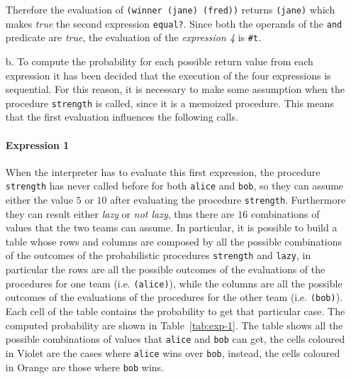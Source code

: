 \begin{itemize}
        Therefore the evaluation of \texttt{(winner \textquotesingle(jane) \textquotesingle(fred))} returns \texttt{\textquotesingle(jane)} 
        which makes \textit{true} the second expression \texttt{equal?}. 
        Since both the operands of the \texttt{and} predicate are \textit{true}, the evaluation of the \textit{expression 4} is 
        \texttt{\#t}.

    \item[b.] To compute the probability for each possible return value from each expression it has been decided that the execution
        of the four expressions is sequential. For this reason, it is necessary to make some assumption when the procedure \texttt{strength} is
        called, since it is a memoized procedure. This means that the first evaluation influences the following calls.

        \paragraph*{Expression 1} When the interpreter has to evaluate this first expression, the procedure \texttt{strength} has never 
        called before for both \texttt{\textquotesingle alice} and \texttt{\textquotesingle bob}, so they can assume either the value $5$ or $10$ after evaluating
        the procedure \texttt{strength}. Furthermore they can result either \textit{lazy} or \textit{not lazy}, thus there are
        $16$ combinations of values that the two teams can assume.
        In particular, it is possible to build a table whose rows and columns are composed by all the possible combinations of
        the outcomes of the probabilistic procedures \texttt{strength} and \texttt{lazy}, in particular
        the rows are all the possible outcomes of the evaluations of the procedures for one team (i.e. \texttt{\textquotesingle (alice)}), 
        while the columns are all the possible outcomes of the evaluations of the procedures for the other team (i.e. \texttt{\textquotesingle (bob)}).
        Each cell of the table contains the probability to get that particular case. The computed probability are shown
        in Table~\ref{tab:exp-1}.
        The table shows all the possible combinations of values that \texttt{\textquotesingle alice} and \texttt{\textquotesingle bob} can get, the cells coloured
        in Violet are the cases where \texttt{\textquotesingle alice} wins over \texttt{\textquotesingle bob}, instead, the cells coloured in Orange are those
        where \texttt{\textquotesingle bob} wins.


\end{itemize}
